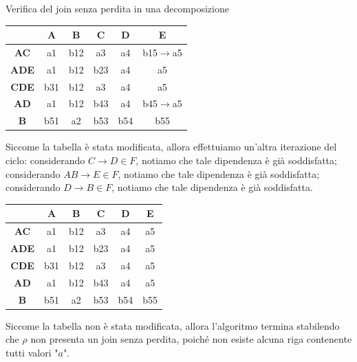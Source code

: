 \begin{Example}{Verifica del join senza perdita in una decomposizione}{}
    \begin{center}
        \begin{tabular}{|c|c|c|c|c|c|}
            \hline &\textbf{A} & \textbf{B} & \textbf{C} & \textbf{D} & \textbf{E}\\\hline
            \textbf{AC} & a1 & b12 & a3 &a4 & b15$\to$a5\\
            \textbf{ADE} & a1 & b12 & b23 & a4 & a5\\
            \textbf{CDE} & b31 & b12 & a3 & a4 & a5\\
            \textbf{AD} & a1 & b12 & b43 & a4 & b45$\to$a5\\
            \textbf{B} & b51 & a2 & b53 & b54 & b55\\\hline
        \end{tabular}\hspace{1cm}
    \end{center}
    Siccome la tabella è stata modificata, allora effettuiamo un'altra iterazione del ciclo: considerando $C\to D\in F$, notiamo che tale dipendenza è già soddisfatta; considerando $AB\to E\in F$, notiamo che tale dipendenza è già soddisfatta; considerando $D\to B\in F$, notiamo che tale dipendenza è già soddisfatta.
\begin{center}
        \begin{tabular}{|c|c|c|c|c|c|}
            \hline &\textbf{A} & \textbf{B} & \textbf{C} & \textbf{D} & \textbf{E}\\\hline
            \textbf{AC} & a1 & b12 & a3 &a4 & a5\\
            \textbf{ADE} & a1 & b12 & b23 & a4 & a5\\
            \textbf{CDE} & b31 & b12 & a3 & a4 & a5\\
            \textbf{AD} & a1 & b12 & b43 & a4 & a5\\
            \textbf{B} & b51 & a2 & b53 & b54 & b55\\\hline
        \end{tabular}\hspace{1cm}
    \end{center}
    Siccome la tabella non è stata modificata, allora l'algoritmo termina stabilendo che $\rho$ non presenta un join senza perdita, poiché non esiste alcuna riga contenente tutti valori "$a$".
\end{Example}

